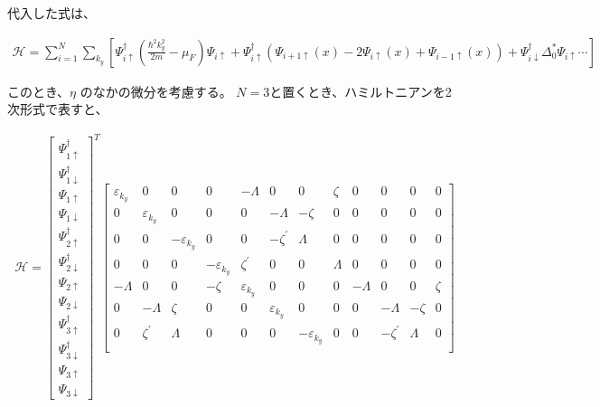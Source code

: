 \documentclass{jsarticle}
\begin{document}
		代入した式は、

		\begin{align}
			\mathcal{H}= \sum_{i=1}^N \sum_{k_y}
			\left[ \Psi^\dagger_{i\uparrow} \left( \frac{\hbar^2k_y^2}{2m}-\mu_F \right)\Psi_{i\uparrow}
			+\Psi^\dagger_{i\uparrow} \left( \Psi_{i+1\uparrow}\left(x\right)-2\Psi_{i\uparrow}\left(x\right)+\Psi_{i-1\uparrow}\left(x\right)
			\right)+\Psi^\dagger_{i\downarrow} \Delta_0^\ast \Psi_{i\uparrow} \cdots
			\right]
			\label{hamil3}
		\end{align}

		このとき、$\eta$ のなかの微分を考慮する。
		$N=3$と置くとき、ハミルトニアンを2次形式で表すと、

		\begin{align}
			\mathcal{H}=
			\begin{bmatrix}
				\Psi_{1\uparrow}^\dagger \\
				\Psi_{1\downarrow}^\dagger \\
				\Psi_{1\uparrow} \\
				\Psi_{1\downarrow} \\
				\Psi_{2\uparrow}^\dagger \\
				\Psi_{2\downarrow}^\dagger \\
				\Psi_{2\uparrow} \\
				\Psi_{2\downarrow} \\
				\Psi_{3\uparrow}^\dagger \\
				\Psi_{3\downarrow}^\dagger \\
				\Psi_{3\uparrow} \\
				\Psi_{3\downarrow}
			\end{bmatrix}
			^T
			\begin{bmatrix}
				\varepsilon_{k_y} & 0 & 0 & 0 & -\varLambda & 0 & 0 & \zeta & 0 & 0 & 0 & 0 \\
				0 & \varepsilon_{k_y} & 0 & 0 & 0 & -\varLambda & -\zeta & 0 & 0 & 0 & 0 & 0 \\
				0 & 0 & -\varepsilon_{k_y} & 0 & 0 & -\zeta^{'} & \varLambda & 0 & 0 & 0 & 0 & 0 \\
				0 & 0 & 0 & -\varepsilon_{k_y} & \zeta^{'} & 0 & 0 & \varLambda & 0 & 0 & 0 & 0 \\
				-\varLambda & 0 & 0 & -\zeta & \varepsilon_{k_y} & 0 & 0 & 0 & -\varLambda & 0 & 0 & \zeta \\
				0 & -\varLambda & \zeta & 0 & 0 & \varepsilon_{k_y} & 0 & 0 & 0 & -\varLambda & -\zeta & 0 \\
				0 & \zeta^{'} & \varLambda & 0 & 0 & 0 & -\varepsilon_{k_y} & 0 & 0 & -\zeta^{'} & \varLambda & 0 \\

\end{bmatrix}
\end{align}
\end{document}
